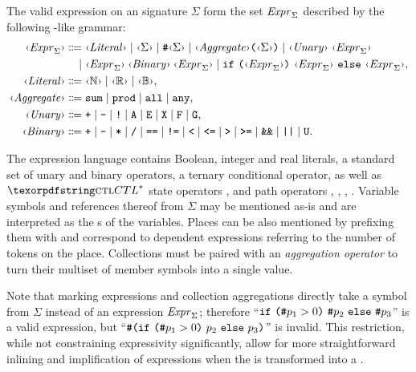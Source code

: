 The valid expression on an  signature \(\Sigma\) form the set \(\textrm{\itshape Expr\/}_\Sigma\) described by the following -like grammar:
\begin{equation}
  \label{eq:rgspn:expression}
  \begin{aligned}
    \ebnfV{\Expr_\Sigma} &\ebnfEq \ebnfVar{Literal} 
    \mid \ebnfV{\Sigma} \mid \lit\# \ebnfV{\Sigma} \mid \ebnfVar{Aggregate} \lit( \ebnfV{\Sigma} \lit)
    \mid \ebnfVar{Unary}\; \ebnfV{\Expr_\Sigma} \\*
    &\ebnfCont \ebnfV{\Expr_\Sigma} \mathbin{\ebnfVar{Binary}} \ebnfV{\Expr_\Sigma}
    \mid \lit{if}\ \lit(\ebnfV{\Expr_\Sigma}\lit)\ \ebnfV{\Expr_\Sigma}\ \lit{else}\ \ebnfV{\Expr_\Sigma} \text, \\
    \ebnfVar{Literal} &\ebnfEq \ebnfV{\NN} \mid \ebnfV{\RR} \mid \ebnfV{\BB} \text, \\
    \ebnfVar{Aggregate} &\ebnfEq \lit{sum} \mid \lit{prod}
    \mid \lit{all} \mid \lit{any} \text, \\  
    \ebnfVar{Unary} &\ebnfEq \lit{+} \mid \lit{-} \mid \lit{!} \mid \lit{A} \mid \lit{E} \mid \lit{X}  \mid \lit{F} \mid \lit{G} \text, \\
    \ebnfVar{Binary} &\ebnfEq \lit{+} \mid \lit{-} \mid \lit{*} \mid \lit{/}
    \mid \lit{==} \mid \lit{!=} \mid \lit{<} \mid \lit{<=} \mid \lit{>} \mid \lit{>=}
    \mid \lit{\&\&} \mid \lit{||} \mid \lit{U} \text.
  \end{aligned}
\end{equation}

The expression language contains Boolean, integer and real literals, a standard set of unary and binary operators, a ternary conditional operator, as well as \(\textabbr{CTL}^*\) state operators ,  and path operators , , , . Variable symbols and references thereof from \(\Sigma\) may be mentioned as-is and are interpreted as the s of the variables. Places can be also mentioned by prefixing them with \lit{\#} and correspond to  dependent expressions referring to the number of tokens on the place. Collections must be paired with an \emph{aggregation operator} to turn their multiset of member symbols into a single value.

Note that marking expressions and collection aggregations directly take a symbol from \(\Sigma\) instead of an expression \(\textrm{\itshape Expr\/}_\Sigma\); therefore \enquote{\(\lit{if}\ \lit(\lit\#p_1 > 0\lit)\ \lit\#p_2\ \lit{else}\ \lit\#p_3\)} is a valid expression, but \enquote{\(\lit\#\lit(\lit{if}\ \lit(\lit\#p_1 > 0\lit)\ p_2\ \lit{else}\ p_3\lit)\)} is invalid. This restriction, while not constraining expressivity significantly, allow for more straightforward inlining and implification of expressions when the  is transformed into a .

